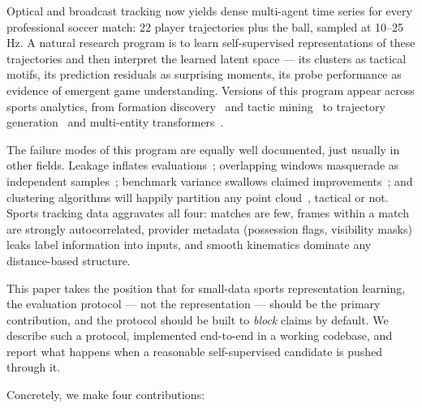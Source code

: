 \documentclass{article}
\begin{document}
Optical and broadcast tracking now yields dense multi-agent time series for
every professional soccer match: 22 player trajectories plus the ball, sampled
at 10--25\,Hz. A natural research program is to learn self-supervised
representations of these trajectories and then interpret the learned latent
space --- its clusters as tactical motifs, its prediction residuals as
surprising moments, its probe performance as evidence of emergent game
understanding. Versions of this program appear across sports analytics,
from formation discovery~\citep{bialkowski2014large} and tactic
mining~\citep{decroos2018tactics} to trajectory
generation~\citep{le2017coordinated,yeh2019diverse,zhan2019generating} and
multi-entity transformers~\citep{alcorn2021baller2vec}.

The failure modes of this program are equally well documented, just usually in
other fields. Leakage inflates evaluations~\citep{kapoor2023leakage};
overlapping windows masquerade as independent samples~\citep{lones2021pitfalls};
benchmark variance swallows claimed improvements~\citep{bouthillier2021accounting};
and clustering algorithms will happily partition any point
cloud~\citep{rousseeuw1987silhouettes}, tactical or not. Sports tracking data
aggravates all four: matches are few, frames within a match are strongly
autocorrelated, provider metadata (possession flags, visibility masks) leaks
label information into inputs, and smooth kinematics dominate any
distance-based structure.

This paper takes the position that for small-data sports representation
learning, the evaluation protocol --- not the representation --- should be the
primary contribution, and the protocol should be built to \emph{block} claims
by default. We describe such a protocol, implemented end-to-end in a working
codebase, and report what happens when a reasonable self-supervised candidate
is pushed through it.

Concretely, we make four contributions:
\end{document}
